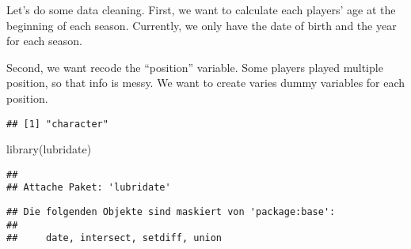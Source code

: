 \documentclass[
]{book}
\newenvironment{Shaded}{\begin{snugshade}}{\end{snugshade}}
\newcommand{\AttributeTok}[1]{\textcolor[rgb]{0.77,0.63,0.00}{#1}}
\newcommand{\CommentTok}[1]{\textcolor[rgb]{0.56,0.35,0.01}{\textit{#1}}}
\newcommand{\FunctionTok}[1]{\textcolor[rgb]{0.00,0.00,0.00}{#1}}
\newcommand{\NormalTok}[1]{#1}
\newcommand{\OtherTok}[1]{\textcolor[rgb]{0.56,0.35,0.01}{#1}}
\newcommand{\SpecialCharTok}[1]{\textcolor[rgb]{0.00,0.00,0.00}{#1}}
\begin{document}
Let's do some data cleaning. First, we want to calculate each players' age at the
beginning of each season. Currently, we only have the date of birth and the year
for each season.

Second, we want recode the ``position'' variable. Some players played multiple
position, so that info is messy. We want to create varies dummy variables
for each position.

\begin{Shaded}
\end{Shaded}

\begin{verbatim}
## [1] "character"
\end{verbatim}

\begin{Shaded}
\begin{Highlighting}[]
\FunctionTok{library}\NormalTok{(lubridate)}
\end{Highlighting}
\end{Shaded}

\begin{verbatim}
## 
## Attache Paket: 'lubridate'
\end{verbatim}

\begin{verbatim}
## Die folgenden Objekte sind maskiert von 'package:base':
## 
##     date, intersect, setdiff, union
\end{verbatim}

\begin{Shaded}
\end{Shaded}
\end{document}
